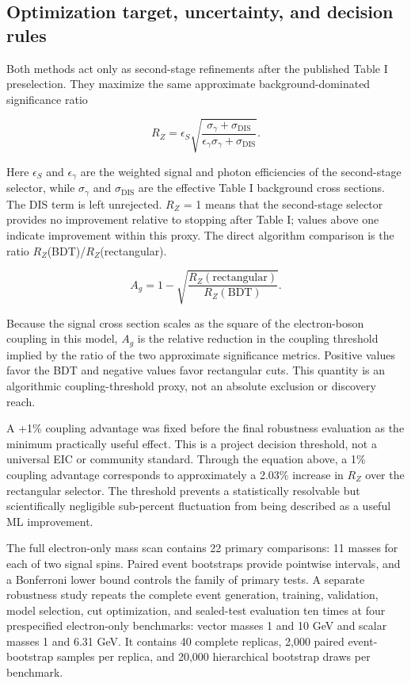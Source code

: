 \documentclass[particles,article,submit,moreauthors,pdftex]{Definitions/mdpi}
\begin{document}
\subsection{Optimization target, uncertainty, and decision rules}\label{sec:4.4}

Both methods act only as second-stage refinements after the published Table I preselection. They maximize the same approximate background-dominated significance ratio

\begin{equation} R_Z = \epsilon_S\sqrt{\frac{\sigma_\gamma+\sigma_{\mathrm{DIS}}}{\epsilon_\gamma\sigma_\gamma+\sigma_{\mathrm{DIS}}}}.\label{eq:rz}\end{equation}

Here $\epsilon_S$ and $\epsilon_\gamma$ are the weighted signal and photon efficiencies of the second-stage selector, while $\sigma_\gamma$ and $\sigma_{\mathrm{DIS}}$ are the effective Table I background cross sections. The DIS term is left unrejected. $R_Z$ = 1 means that the second-stage selector provides no improvement relative to stopping after Table I; values above one indicate improvement within this proxy. The direct algorithm comparison is the ratio $R_Z$(BDT)/$R_Z$(rectangular).

\begin{equation} A_g=1-\sqrt{\frac{R_Z(\mathrm{rectangular})}{R_Z(\mathrm{BDT})}}.\label{eq:ag}\end{equation}

Because the signal cross section scales as the square of the electron-boson coupling in this model, $A_g$ is the relative reduction in the coupling threshold implied by the ratio of the two approximate significance metrics. Positive values favor the BDT and negative values favor rectangular cuts. This quantity is an algorithmic coupling-threshold proxy, not an absolute exclusion or discovery reach.

A +1\% coupling advantage was fixed before the final robustness evaluation as the minimum practically useful effect. This is a project decision threshold, not a universal EIC or community standard. Through the equation above, a 1\% coupling advantage corresponds to approximately a 2.03\% increase in $R_Z$ over the rectangular selector. The threshold prevents a statistically resolvable but scientifically negligible sub-percent fluctuation from being described as a useful ML improvement.

The full electron-only mass scan contains 22 primary comparisons: 11 masses for each of two signal spins. Paired event bootstraps provide pointwise intervals, and a Bonferroni lower bound controls the family of primary tests. A separate robustness study repeats the complete event generation, training, validation, model selection, cut optimization, and sealed-test evaluation ten times at four prespecified electron-only benchmarks: vector masses 1 and 10 GeV and scalar masses 1 and 6.31 GeV. It contains 40 complete replicas, 2,000 paired event-bootstrap samples per replica, and 20,000 hierarchical bootstrap draws per benchmark.
\end{document}
